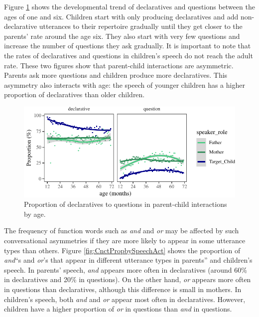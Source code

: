 \documentclass[floatsintext,man]{apa6}
\theoremstyle{definition}
\theoremstyle{definition}
\theoremstyle{definition}
\theoremstyle{remark}
\begin{document}
Figure \ref{fig:utteranceTypeByAgePlot} shows the developmental trend of
declaratives and questions between the ages of one and six. Children
start with only producing declaratives and add non-declarative
utterances to their repertoire gradually until they get closer to the
parents' rate around the age six. They also start with very few
questions and increase the number of questions they ask gradually. It is
important to note that the rates of declaratives and questions in
children's speech do not reach the adult rate. These two figures show
that parent-child interactions are asymmetric. Parents ask more
questions and children produce more declaratives. This asymmetry also
interacts with age: the speech of younger children has a higher
proportion of declaratives than older children.

\begin{figure}
\centering
\includegraphics{figs/utteranceTypeByAgePlot-1.pdf}
\caption{\label{fig:utteranceTypeByAgePlot}Proportion of declaratives to
questions in parent-child interactions by age.}
\end{figure}

The frequency of function words such as \emph{and} and \emph{or} may be
affected by such conversational asymmetries if they are more likely to
appear in some utterance types than others. Figure
\ref{fig:CnctPropbySpeechAct} shows the proportion of
\emph{and}\enquote{s and \emph{or}'s that appear in different utterance
types in parents} and children's speech. In parents' speech, \emph{and}
appears more often in declaratives (around 60\% in declaratives and 20\%
in questions). On the other hand, \emph{or} appears more often in
questions than declaratives, although this difference is small in
mothers. In children's speech, both \emph{and} and \emph{or} appear most
often in declaratives. However, children have a higher proportion of
\emph{or} in questions than \emph{and} in questions.
\end{document}

